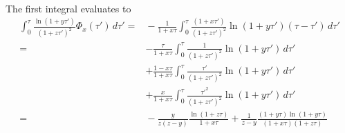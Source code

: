 \documentclass[11pt]{article}
\begin{document}
\begin{align}
\end{align}
The first integral evaluates to 
\begin{align}
    \int_0^{\tau} \frac{\ln(1+y\tau')}{(1+z\tau')^2} \Phi_x(\tau') \,d\tau'
    =&{} -\frac{1}{1+x\tau} \int_0^{\tau} \frac{(1+x\tau')}{(1+z\tau')^2} \ln(1+y\tau')(\tau-\tau') \,d\tau' \\\nonumber
    =& -\frac{\tau}{1+x\tau}\int_0^{\tau} \frac{1}{(1+z\tau')^2} \ln(1+y\tau')\,d\tau'\\\nonumber
    &+ \frac{1-x\tau}{1+x\tau}\int_0^{\tau} \frac{\tau'}{(1+z\tau')^2} \ln(1+y\tau')\,d\tau'\\\nonumber
    &+ \frac{x}{1+x\tau}\int_0^{\tau} \frac{\tau'^2}{(1+z\tau')^2} \ln(1+y\tau')\,d\tau'\\\nonumber
    =&{} -\frac{y}{z(z-y)}\frac{\ln(1+z\tau)}{1+x\tau} + \frac{1}{z-y}\frac{(1+y\tau)\ln(1+y\tau)}{(1+x\tau)(1+z\tau)}
\end{align}
\end{document}
